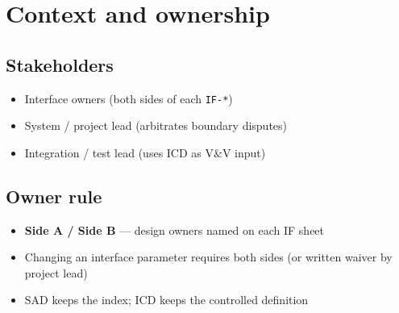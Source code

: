\section{Context and ownership}


\subsection{Stakeholders}

\begin{itemize}
  \item Interface owners (both sides of each \texttt{IF-*})
  \item System / project lead (arbitrates boundary disputes)
  \item Integration / test lead (uses ICD as V\&V input)
\end{itemize}

\subsection{Owner rule}

\begin{itemize}
  \item \textbf{Side A / Side B} --- design owners named on each IF sheet
  \item Changing an interface parameter requires both sides (or written waiver
    by project lead)
  \item SAD keeps the index; ICD keeps the controlled definition
\end{itemize}
